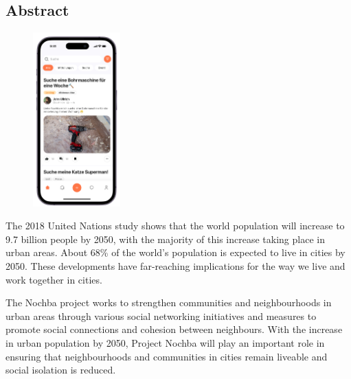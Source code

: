 \begin{spacing}{1}
  \chapter*{Abstract}
\end{spacing}
\begin{figure}
  \begin{center}
    \includegraphics[width=0.3\textwidth]{pics/iphone.png}
  \end{center}
\end{figure}
The 2018 United Nations study \cite{un2018world} shows that the world population will increase to 9.7 billion people by 2050, with the majority of this increase taking place in urban areas. About 68\% of the world's population is expected to live in cities by 2050. These developments have far-reaching implications for the way we live and work together in cities.

The Nochba project works to strengthen communities and neighbourhoods in urban areas through various social networking initiatives and measures to promote social connections and cohesion between neighbours. With the increase in urban population by 2050, Project Nochba will play an important role in ensuring that neighbourhoods and communities in cities remain liveable and social isolation is reduced.

